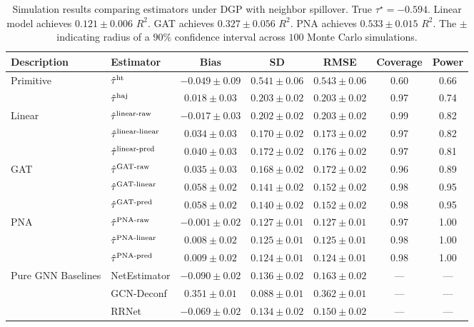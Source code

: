 \documentclass{article}
\theoremstyle{plain}
\theoremstyle{definition}
\theoremstyle{remark}
\newcommand{\hort}{\textup{ht}}
\newcommand{\haj}{\textup{haj}}
\begin{document}
\begin{table}[h!]
    \centering
    \caption{Simulation results comparing estimators under DGP with neighbor spillover. True $\tau^\star = -0.594$. Linear model achieves $0.121 \pm 0.006$ $R^2$. GAT achieves $0.327 \pm 0.056$ $R^2$. PNA achieves $0.533 \pm 0.015 $ $R^2$. The $\pm$ indicating radius of a $90\%$ confidence interval across $100$ Monte Carlo simulations. }
    \small
    \begin{tabular}{ll|ccc|cc}
        \toprule
        Description & Estimator & Bias & SD & RMSE & Coverage & Power \\
        \midrule
        Primitive  & $\hat\tau^{\hort}$ & $-0.049 \pm 0.09$ & $0.541 \pm 0.06$ & $0.543 \pm 0.06$ & 0.60 & 0.66 \\
        & $\hat\tau^{\haj}$ & $0.018 \pm 0.03$ & $0.203 \pm 0.02$ & $0.203 \pm 0.02$ & 0.97 & 0.74 \\
        \midrule
        Linear 
        & $\hat\tau^{\textup{linear-raw}}$ & $-0.017 \pm 0.03$ & $0.202 \pm 0.02$ & $0.203 \pm 0.02$ & 0.99 & 0.82 \\
        & $\hat\tau^{\textup{linear-linear}}$ & $0.034 \pm 0.03$ & $0.170 \pm 0.02$ & $0.173 \pm 0.02$ & 0.97 & 0.82 \\
        & $\hat\tau^{\textup{linear-pred}}$ & $0.040 \pm 0.03$ & $0.172 \pm 0.02$ & $0.176 \pm 0.02$ & 0.97 & 0.81 \\
        \midrule
        GAT 
        & $\hat\tau^{\textup{GAT-raw}}$ & $0.035 \pm 0.03$ & $0.168 \pm 0.02$ & $0.172 \pm 0.02$ & 0.96 & 0.89 \\
        & $\hat\tau^{\textup{GAT-linear}}$ & $0.058 \pm 0.02$ & $0.141 \pm 0.02$ & $0.152 \pm 0.02$ & 0.98 & 0.95 \\
        & $\hat\tau^{\textup{GAT-pred}}$ & $0.058 \pm 0.02$ & $0.140 \pm 0.02$ & $0.152 \pm 0.02$ & 0.98 & 0.95 \\
        \midrule
        PNA 
        & $\hat\tau^{\textup{PNA-raw}}$ & $\mathbf{-0.001 \pm 0.02}$ & $\mathbf{0.127 \pm 0.01}$ & $\mathbf{0.127 \pm 0.01}$ & 0.97 & 1.00 \\
        & $\hat\tau^{\textup{PNA-linear}}$ & $\mathbf{0.008 \pm 0.02}$ & $\mathbf{0.125 \pm 0.01}$ & $\mathbf{0.125 \pm 0.01}$ & 0.98 & 1.00 \\
        & $\hat\tau^{\textup{PNA-pred}}$ & $\mathbf{0.009 \pm 0.02}$ & $\mathbf{0.124 \pm 0.01}$ & $\mathbf{0.124 \pm 0.01}$ & 0.98 & 1.00 \\
        \midrule 
        Pure GNN Baselines
        & NetEstimator & $-0.090 \pm 0.02$ & $0.136 \pm 0.02$ & $0.163 \pm 0.02$ & {---} & {---} \\
        & GCN-Deconf & $0.351 \pm 0.01$ & $0.088 \pm 0.01$ & $0.362 \pm 0.01$ & {---} & {---} \\
        & RRNet & $-0.069 \pm 0.02$ & $0.134 \pm 0.02$ & $0.150 \pm 0.02$ & {---} & {---} \\
        \bottomrule
    \end{tabular}
    \label{tab::simu_results}
\end{table}
\end{document}
